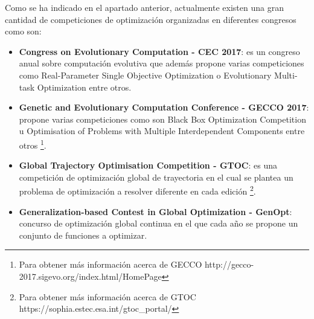 Como se ha indicado en el apartado anterior, actualmente existen una gran cantidad de competiciones de optimización organizadas en diferentes congresos como son:
\begin{itemize}
  \item \textbf{Congress on Evolutionary Computation - CEC 2017}: es un congreso anual sobre computación evolutiva que además propone varias competiciones como Real-Parameter Single Objective Optimization o Evolutionary Multi-task Optimization entre otros.
  \item \textbf{Genetic and Evolutionary Computation Conference - GECCO 2017}: propone varias competiciones como son Black Box Optimization Competition u Optimisation of Problems with Multiple Interdependent Components entre otros \footnote{Para obtener más información acerca de GECCO http://gecco-2017.sigevo.org/index.html/HomePage}.
  \item \textbf{Global Trajectory Optimisation Competition - GTOC}: es una competición de optimización global de trayectoria en el cual se plantea un problema de optimización a resolver diferente en cada edición \footnote{Para obtener más información acerca de GTOC https://sophia.estec.esa.int/gtoc\_portal/}.
  \item \textbf{Generalization-based Contest in Global Optimization - GenOpt}: concurso de optimización global continua en el que cada año se propone un conjunto de funciones a optimizar. 
\end{itemize}

